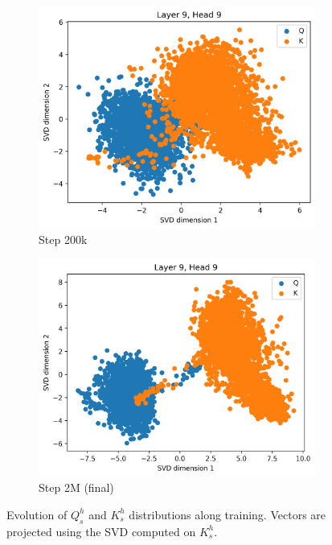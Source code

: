 \begin{appendices}
\begin{figure}[ht]
    \begin{subfigure}[b]{0.24\linewidth}
         \includegraphics[width=\linewidth]{sources/part_1/anisotropy/imgs/dist_l9h9_s200_K.png}
         \caption{Step 200k}
         \label{fig:dist_qk_s200_K}
    \end{subfigure}
    \begin{subfigure}[b]{0.24\linewidth}
         \includegraphics[width=\linewidth]{sources/part_1/anisotropy/imgs/dist_l9h9_s2000_K.png}
         \caption{Step 2M (final)}
         \label{fig:dist_qk_s2M_K}
    \end{subfigure}
    \caption{Evolution of $Q^h_s$ and $K^h_s$ distributions along training. Vectors are projected using the SVD computed on $K^h_s$.}
    \label{fig:proj_qk_heads_K}
\end{figure}


\end{appendices}
